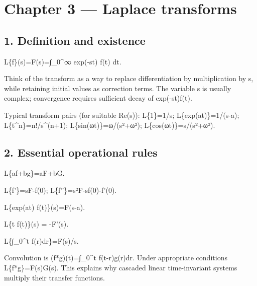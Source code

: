 \documentclass[11pt,a4paper]{article}
\begin{document}
\section{Chapter 3 — Laplace transforms}

\subsection{1. Definition and existence}
\begin{equationbox}\raggedright
{\ttfamily\small L\{f\}(s)=F(s)=∫\_0\textasciicircum{}∞ exp(-st) f(t) dt.}\par
\end{equationbox}
\begin{conceptbox}Think of the transform as a way to replace differentiation by multiplication by s, while retaining initial values as correction terms. The variable s is usually complex; convergence requires sufficient decay of exp(-st)f(t).\end{conceptbox}
\begin{conceptbox}Typical transform pairs (for suitable Re(s)): L\{1\}=1/s; L\{exp(at)\}=1/(s-a); L\{t\textasciicircum{}n\}=n!/s\textasciicircum{}(n+1); L\{sin(ωt)\}=ω/(s²+ω²); L\{cos(ωt)\}=s/(s²+ω²).\end{conceptbox}

\subsection{2. Essential operational rules}
\begin{equationbox}\raggedright
{\ttfamily\small L\{af+bg\}=aF+bG.}\par
\end{equationbox}
\begin{equationbox}\raggedright
{\ttfamily\small L\{f'\}=sF-f(0); L\{f''\}=s²F-sf(0)-f'(0).}\par
\end{equationbox}
\begin{equationbox}\raggedright
{\ttfamily\small L\{exp(at) f(t)\}(s)=F(s-a).}\par
\end{equationbox}
\begin{equationbox}\raggedright
{\ttfamily\small L\{t f(t)\}(s) = -F'(s).}\par
\end{equationbox}
\begin{equationbox}\raggedright
{\ttfamily\small L\{∫\_0\textasciicircum{}t f(r)dr\}=F(s)/s.}\par
\end{equationbox}
\begin{conceptbox}Convolution is (f*g)(t)=∫\_0\textasciicircum{}t f(t-r)g(r)dr. Under appropriate conditions L\{f*g\}=F(s)G(s). This explains why cascaded linear time-invariant systems multiply their transfer functions.\end{conceptbox}
\end{document}
